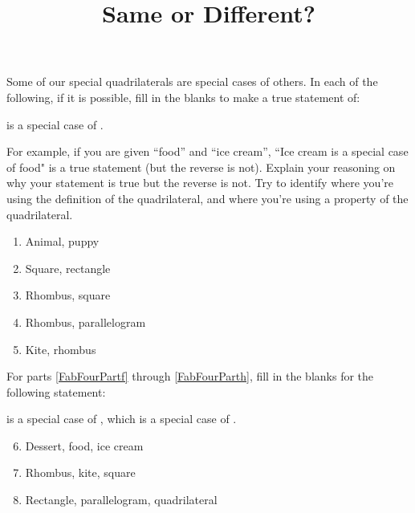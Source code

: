 \documentclass[nooutcomes,noauthor, handout]{ximera}
\title{Same or Different?}
\begin{document}
\begin{abstract}\end{abstract}
\maketitle



\begin{problem}
Some of our special quadrilaterals are special cases of others.  In each of the following, if it is possible, fill in the blanks to make a true statement of:

\begin{center} \underline{\hspace{1in}} is a special case of \underline{\hspace{1in}}. \end{center}

For example, if you are given ``food'' and ``ice cream'', ``Ice cream is a special case of food" is a true statement (but the reverse is not).  Explain your reasoning on why your statement is true but the reverse is not.  Try to identify where you're using the definition of the quadrilateral, and where you're using a property of the quadrilateral.
\begin{enumerate}
\item  Animal, puppy
\item  Square, rectangle
\item Rhombus, square
\item  Rhombus, parallelogram
\item  Kite, rhombus
\end{enumerate}

For parts \ref{FabFourPartf} through \ref{FabFourParth}, fill in the blanks for the following statement:

\begin{center} \underline{\hspace{0.5in}} is a special case of \underline{\hspace{0.5in}}, which is a special case of \underline{\hspace{0.5in}}. \end{center}

\begin{enumerate}
\setcounter{enumi}{5}
    \item Dessert, food, ice cream \label{FabFourPartf}
    \item  Rhombus, kite, square
    \item Rectangle, parallelogram, quadrilateral \label{FabFourParth}
\end{enumerate}


\end{problem}
\end{document}
